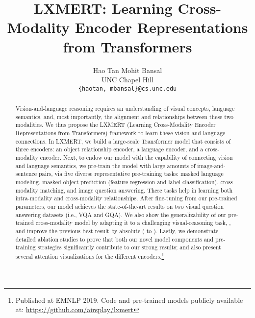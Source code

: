 \documentclass[11pt,a4paper]{article}
\title{LXMERT: Learning Cross-Modality Encoder Representations \\ from Transformers}
\author{Hao Tan \;\;\;\;\;\;\; Mohit Bansal \\
  UNC Chapel Hill \\
  {\tt \{haotan, mbansal\}@cs.unc.edu} \\
 }
\date{}
\begin{document}
\maketitle
\begin{abstract}
Vision-and-language reasoning requires an understanding of visual concepts, language semantics, and, most importantly, the alignment and relationships between these two modalities.
We thus propose the LXMERT (Learning Cross-Modality Encoder Representations from Transformers) framework to learn these vision-and-language connections. In LXMERT, we build a large-scale Transformer model that consists of three encoders: an object relationship encoder, a language encoder, and a cross-modality encoder.
Next, to endow our model with the capability of connecting vision and language semantics, we pre-train the model with large amounts of image-and-sentence pairs, via five diverse representative pre-training tasks: masked language modeling, masked object prediction (feature regression and label classification), cross-modality matching, and image question answering. 
These tasks help in learning both intra-modality and cross-modality relationships.
After fine-tuning from our pre-trained parameters, our model achieves the state-of-the-art results on two visual question answering datasets (i.e., VQA and GQA).
We also show the generalizability of our pre-trained cross-modality model by adapting it to a challenging visual-reasoning task, , and improve the previous best result by  absolute ( to ).
Lastly, we demonstrate detailed ablation studies to prove that both our novel model components and pre-training strategies significantly contribute to our strong results; and also present several attention visualizations for the different encoders.\footnote{Published at EMNLP 2019. Code and pre-trained models publicly available at:  \href{https://github.com/airsplay/lxmert}{https://github.com/airsplay/lxmert}}

\end{abstract}
\end{document}
